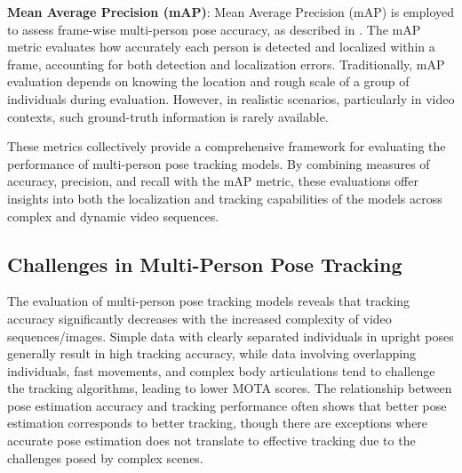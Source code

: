 \textbf{Mean Average Precision (mAP)}: Mean Average Precision (mAP) is employed
to assess frame-wise multi-person pose accuracy, as described in
\cite{pishchulin2016deepcut}. The mAP metric evaluates how accurately each
person is detected and localized within a frame, accounting for both detection
and localization errors. Traditionally, mAP evaluation depends on knowing the
location and rough scale of a group of individuals during evaluation. However,
in realistic scenarios, particularly in video contexts, such ground-truth
information is rarely available.

These metrics collectively provide a comprehensive framework for evaluating the
performance of multi-person pose tracking models. By combining measures of
accuracy, precision, and recall with the mAP metric, these evaluations offer
insights into both the localization and tracking capabilities of the models
across complex and dynamic video sequences.

\subsection{Challenges in Multi-Person Pose Tracking}
The evaluation of multi-person pose tracking models reveals that tracking
accuracy significantly decreases with the increased complexity of video
sequences/images. Simple data with clearly separated individuals in upright poses
generally result in high tracking accuracy, while data involving
overlapping individuals, fast movements, and complex body articulations tend to
challenge the tracking algorithms, leading to lower MOTA scores. The
relationship between pose estimation accuracy and tracking performance often
shows that better pose estimation corresponds to better tracking, though there
are exceptions where accurate pose estimation does not translate to effective
tracking due to the challenges posed by complex scenes.